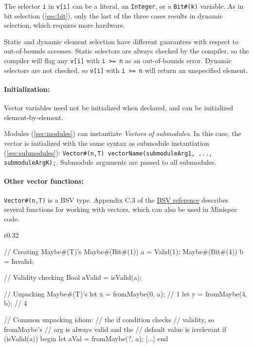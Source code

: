 The selector \verb|i| in \verb|v[i]| can be a literal, an \verb|Integer|, or a \verb|Bit#(k)| variable.
As in bit selection (\autoref{sec:bit}), only the last of the three cases results in dynamic selection,
which requires more hardware.

Static and dynamic element selection have different guarantees with respect to out-of-bounds accesses.
Static selectors are always checked by the compiler,
so the compiler will flag any \verb|v[i]| with \verb|i >= n| as an out-of-bounds error.
Dynamic selectors are not checked, so \verb|v[i]| with \verb|i >= n| will return an unspecified element.

\paragraph{Initialization:} Vector variables need not be initialized when declared,
and can be initialized element-by-element.

Modules (\autoref{sec:modules}) can instantiate \emph{Vectors of submodules}.
In this case, the vector is initialized with the same syntax as submodule instantiation (\autoref{sec:submodules}):
\verb|Vector#(n,T) vectorName(submoduleArg1, ..., submoduleArgK);|. Submodule arguments are passed to all submodules.

\paragraph{Other vector functions:} \verb|Vector#(n,T)| is a BSV type.
Appendix C.3 of the \href{TODO}{BSV reference} describes several functions for working with vectors,
which can also be used in Minispec code.

\begin{wrapfigure}{r}{0.32\columnwidth}
\vspace{-4em}
\begin{mscode}
// Creating Maybe#(T)'s
Maybe#(Bit#(1)) a = Valid(1);
Maybe#(Bit#(4)) b = Invalid;

// Validity checking
Bool aValid = isValid(a);

// Unpacking Maybe#(T)'s
let x = fromMaybe(0, a); // 1
let y = fromMaybe(4, b); // 4

// Common unpacking idiom:
// the if condition checks
// validity, so fromMaybe's
// arg is always valid and the
// default value is irrelevant
if (isValid(a)) begin
  let aVal = fromMaybe(?, a);
  [...]
end
\end{mscode}
\vspace{-5em}
\end{wrapfigure}

